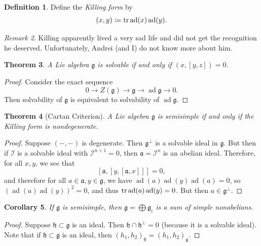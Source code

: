 \documentclass[leqno, openany]{memoir}
\newtheorem{thm}{Theorem}[section]
\newtheorem{cor}[thm]{Corollary}
\theoremstyle{definition}
\newtheorem{defn}[thm]{Definition}
\theoremstyle{remark}
\newtheorem{rmk}[thm]{Remark}
\theoremstyle{plain}
\theoremstyle{definition}
\theoremstyle{remark}
\newcommand{\mc}[1]{\mathcal{#1}}
\newcommand{\mf}[1]{\mathfrak{#1}}
\DeclareMathOperator{\ad}{ad}
\begin{document}
\begin{defn}
    Define the \textit{Killing form} by
    \[ (x,y) \coloneqq \tr \ad(x) \ad(y). \]
\end{defn}

\begin{rmk}
    Killing apparently lived a very sad life and did not get the recognition he deserved. Unfortunately, Andrei (and I) do not know more about him.
\end{rmk}

\begin{thm}
    A Lie algebra $\mf{g}$ is solvable if and only if $(x, [y,z]) = 0$.
\end{thm}

\begin{proof}
    Consider the exact sequence
    \[ 0 \to Z(\mf{g}) \to \mf{g} \to \ad \mf{g} \to 0. \]
    Then solvability of $\mf{g}$ is equivalent to solvability of $\ad \mf{g}$.
\end{proof}

\begin{thm}[Cartan Criterion]
    A Lie algebra $\mf{g}$ is semisimple if and only if the Killing form is nondegenerate.
\end{thm}

\begin{proof}
    Suppose $(-,-)$ is degenerate. Then $\mf{g}^{\perp}$ is a solvable ideal in $\mf{g}$. But then if $\mc{I}$ is a solvable ideal with $\mc{I}^{n+1} = 0$, then $\mf{a} = \mc{I}^n$ is an abelian ideal. Therefore, for all $x,y$, we see that
    \[ [\mf{a}, [y,[\mf{a}, x]]] = 0, \]
    and therefore for all $a \in \mf{a}, y \in \mf{g}$, we have $\ad (a) \ad(y) \ad(a) = 0$, so ${(\ad(a) \ad(y))}^2 = 0$, and thus $\tr \ad(a) \ad(y) = 0$. But then $a \in \mf{g}^{\perp}$.
\end{proof}

\begin{cor}
    If $\mf{g}$ is semisimple, then $\mf{g} = \bigoplus \mf{g}_i$ is a sum of simple nonabelians.
\end{cor}

\begin{proof}
    Suppose $\mf{h} \subset \mf{g}$ is an ideal. Then $\mf{h} \cap \mf{h}^{\perp} = 0$ (because it is a solvable ideal). Note that if $\mf{h} \subset \mf{g}$ is an ideal, then ${(h_1, h_2)}_{\mf{h}} = {(h_1, h_2)}_{\mf{g}}$.
\end{proof}
\end{document}
